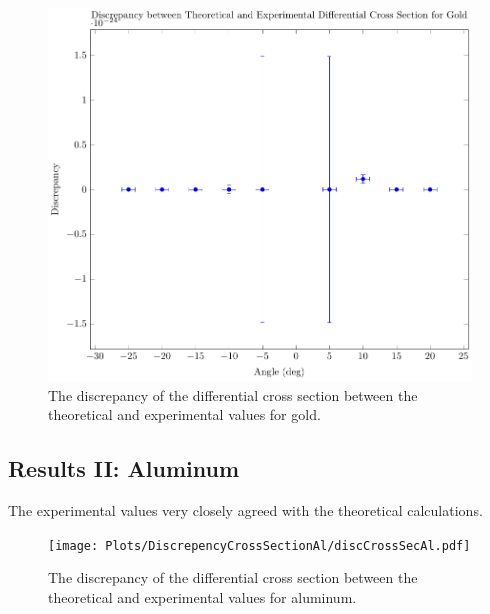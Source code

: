 \documentclass[a4paper]{article}
\begin{document}
\begin{figure}[H]
  \begin{center}
    \includegraphics[scale=0.8]{Plots/DiscrepencyCrossSectionAu/discCrossSecAu.pdf}
  \end{center}
  \caption{The discrepancy of the differential cross section between the
    theoretical and experimental values for gold.}
  \label{gph:expCrossSecUncertGold}
\end{figure}

\subsection{Results II: Aluminum}

\qq

\qq

\qq The experimental values very closely agreed with the theoretical calculations.

\begin{figure}[H]
  \begin{center}
    \texttt{[image: Plots/DiscrepencyCrossSectionAl/discCrossSecAl.pdf]}
  \end{center}
  \caption{The discrepancy of the differential cross section between the
    theoretical and experimental values for aluminum.}
  \label{gph:expCrossSecUncertAl}
\end{figure}
\end{document}
